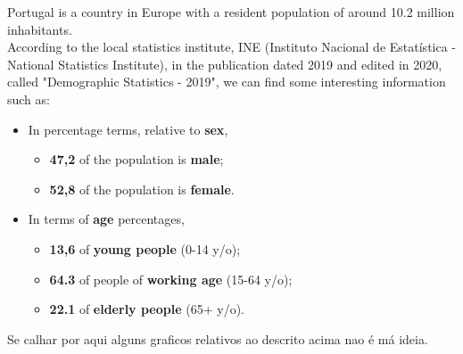 Portugal is a country in Europe with a resident population of around 10.2 million inhabitants.  \\
According to the local statistics institute, INE (Instituto Nacional de Estatística - National Statistics Institute), in the publication dated 2019 and edited in 2020, called \cite{pubINE}"Demographic Statistics - 2019", we can find some interesting information such as:
\begin{itemize}
    \item In percentage terms, relative to \textbf{sex},
    \begin{itemize}
        \item \textbf{47,2\textdiscount} of the population is \textbf{male};
        \item \textbf{52,8 \textdiscount} of the population is \textbf{female}.
    \end{itemize}  
    \item In terms of \textbf{age} percentages, 
    \begin{itemize}
        \item \textbf{13,6\textdiscount} of \textbf{young people} (0-14 y/o);
        \item \textbf{64.3\textdiscount} of people of \textbf{working age} (15-64 y/o);
        \item \textbf{22.1\textdiscount} of \textbf{elderly people} (65+ y/o). 
    \end{itemize}
\end{itemize}

Se calhar por aqui alguns graficos relativos ao descrito acima nao é má ideia.